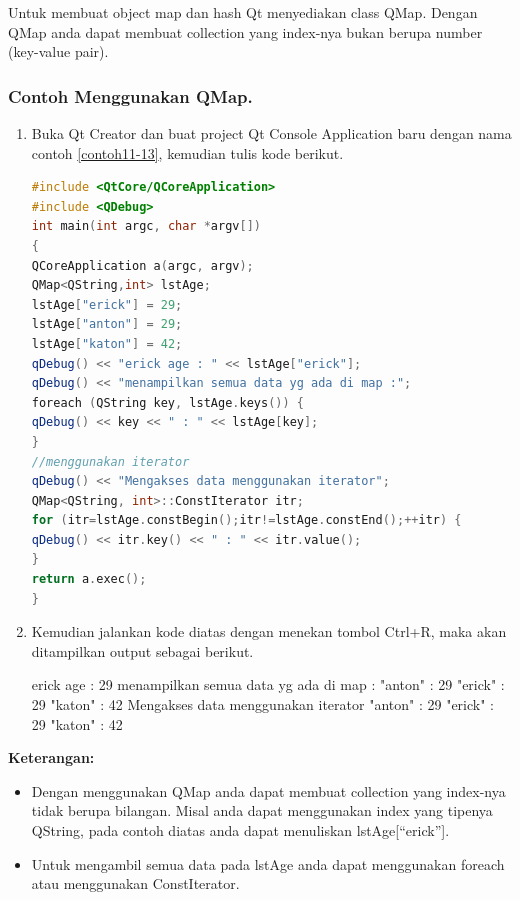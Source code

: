 Untuk membuat object map dan hash Qt menyediakan class QMap. Dengan QMap
anda dapat membuat collection yang index-nya bukan berupa number
(key-value pair).

\subsubsection*{Contoh  Menggunakan QMap.}

\begin{enumerate}

\item
  Buka Qt Creator dan buat project Qt Console Application baru dengan
  nama contoh \ref{contoh11-13}, kemudian tulis kode berikut.

\begin{lstlisting}[language=c++, caption=Menggunakan QMap, label=contoh11-13]
#include <QtCore/QCoreApplication>
#include <QDebug>
int main(int argc, char *argv[])
{
QCoreApplication a(argc, argv);
QMap<QString,int> lstAge;
lstAge["erick"] = 29;
lstAge["anton"] = 29;
lstAge["katon"] = 42;
qDebug() << "erick age : " << lstAge["erick"];
qDebug() << "menampilkan semua data yg ada di map :";
foreach (QString key, lstAge.keys()) {
qDebug() << key << " : " << lstAge[key];
}
//menggunakan iterator
qDebug() << "Mengakses data menggunakan iterator";
QMap<QString, int>::ConstIterator itr;
for (itr=lstAge.constBegin();itr!=lstAge.constEnd();++itr) {
qDebug() << itr.key() << " : " << itr.value();
}
return a.exec();
}
\end{lstlisting}
\item
  Kemudian jalankan kode diatas dengan menekan tombol Ctrl+R, maka akan
  ditampilkan output sebagai berikut.

\begin{lcverbatim}
erick age :  29
menampilkan semua data yg ada di map :
"anton"  :  29
"erick"  :  29
"katon"  :  42
Mengakses data menggunakan iterator
"anton"  :  29
"erick"  :  29
"katon"  :  42
\end{lcverbatim}

\end{enumerate}

\textbf{Keterangan:}

\begin{itemize}

\item
  Dengan menggunakan QMap anda dapat membuat collection yang index-nya
  tidak berupa bilangan. Misal anda dapat menggunakan index yang tipenya
  QString, pada contoh diatas anda dapat menuliskan
  lstAge{[}``erick''{]}.
\item
  Untuk mengambil semua data pada lstAge anda dapat menggunakan foreach
  atau menggunakan ConstIterator.
\end{itemize}
